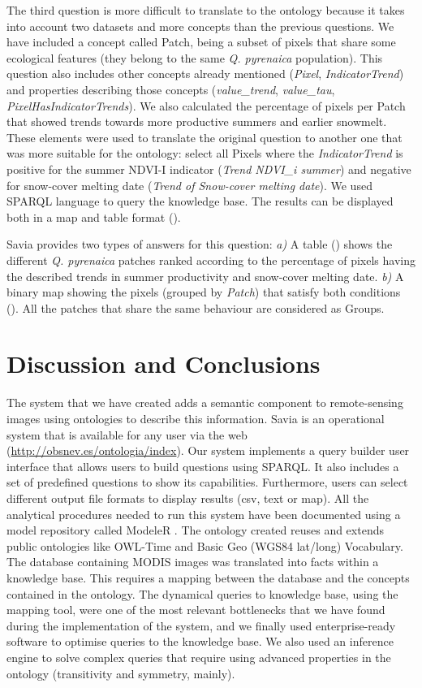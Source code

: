 The third question is more difficult to translate to the ontology because it takes into account two datasets and more concepts than the previous questions. We have included a concept called Patch, being a subset of pixels that share some ecological features (they belong to the same \emph{Q. pyrenaica} population). This question also includes other concepts already mentioned (\emph{Pixel}, \emph{IndicatorTrend}) and properties describing those concepts (\emph{value\_trend}, \emph{value\_tau}, \emph{PixelHasIndicatorTrends}). We also calculated the percentage of pixels per Patch that showed trends towards more productive summers and earlier snowmelt. These elements were used to translate the original question to another one that was more suitable for the ontology: select all Pixels where the \emph{IndicatorTrend} is positive for the summer NDVI-I indicator (\emph{Trend NDVI\_i summer}) and negative for snow-cover melting date (\emph{Trend of Snow-cover melting date}). We used SPARQL language to query the knowledge base. The results can be displayed both in a map and table format ().

Savia provides two types of answers for this question: \emph{a)} A table () shows the different \emph{Q. pyrenaica} patches ranked according to the percentage of pixels having the described trends in summer productivity and snow-cover melting date. \emph{b)} A binary map showing the pixels (grouped by \emph{Patch}) that satisfy both conditions (). All the patches that share the same behaviour are considered as Groups.

\section{Discussion and Conclusions}\label{sec:ontoDiscussion}

The system that we have created adds a semantic component to remote-sensing images using ontologies to describe this information. Savia is an operational system that is available for any user via the web (\url{http://obsnev.es/ontologia/index}).
Our system implements a query builder user interface that allows users to build questions using SPARQL. It also includes a set of predefined questions to show its capabilities. Furthermore, users can select different output file formats to display results (csv, text or map). All the analytical procedures needed to run this system have been documented using a model repository called ModeleR \autocite{Bonetetal2014DocumentingStoring,PerezPerezetal2012ModeleREnviromental}. The ontology created reuses and extends public ontologies like OWL-Time and Basic Geo (WGS84 lat/long) Vocabulary. The database containing MODIS images was translated into facts within a knowledge base. This requires a mapping between the database and the concepts contained in the ontology. The dynamical queries to knowledge base, using the mapping tool, were one of the most relevant bottlenecks that we have found during the implementation of the system, and we finally used enterprise-ready software to optimise queries to the knowledge base. We also used an inference engine to solve complex queries that require using advanced properties in the ontology (transitivity and symmetry, mainly).


